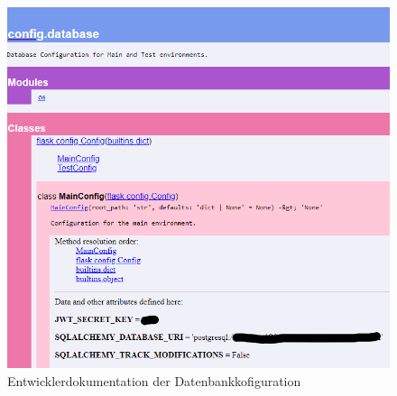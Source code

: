 \documentclass[a4paper,12pt]{article}
\begin{document}
\begin{figure}[h]
\centering
\includegraphics[width=1\textwidth]{bilder/databasedoku.png}
\caption{Entwicklerdokumentation der Datenbankkofiguration}
\end{figure}
\end{document}
